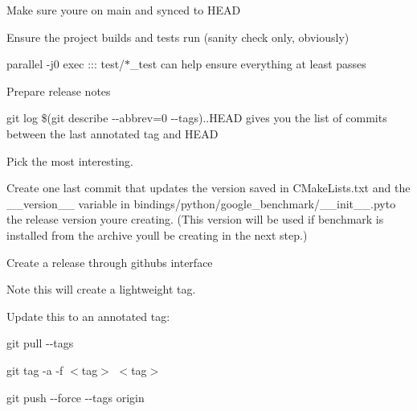 
\begin{DoxyItemize}
\item Make sure you\textquotesingle{}re on main and synced to H\+E\+AD
\item Ensure the project builds and tests run (sanity check only, obviously)
\begin{DoxyItemize}
\item {\ttfamily parallel -\/j0 exec \+::\+: test/$\ast$\+\_\+test} can help ensure everything at least passes
\end{DoxyItemize}
\item Prepare release notes
\begin{DoxyItemize}
\item {\ttfamily git log \$(git describe -\/-\/abbrev=0 -\/-\/tags)..H\+E\+AD} gives you the list of commits between the last annotated tag and H\+E\+AD
\item Pick the most interesting.
\end{DoxyItemize}
\item Create one last commit that updates the version saved in {\ttfamily C\+Make\+Lists.\+txt} and the {\ttfamily \+\_\+\+\_\+version\+\_\+\+\_\+} variable in {\ttfamily bindings/python/google\+\_\+benchmark/\+\_\+\+\_\+init\+\_\+\+\_\+.\+py}to the release version you\textquotesingle{}re creating. (This version will be used if benchmark is installed from the archive you\textquotesingle{}ll be creating in the next step.)
\end{DoxyItemize}


\begin{DoxyCode}{0}
\end{DoxyCode}



\begin{DoxyCode}{0}
\DoxyCodeLine{}
\DoxyCodeLine{}
\DoxyCodeLine{}
\end{DoxyCode}



\begin{DoxyItemize}
\item Create a release through github\textquotesingle{}s interface
\begin{DoxyItemize}
\item Note this will create a lightweight tag.
\item Update this to an annotated tag\+:
\begin{DoxyItemize}
\item {\ttfamily git pull -\/-\/tags}
\item {\ttfamily git tag -\/a -\/f $<$tag$>$ $<$tag$>$}
\item {\ttfamily git push -\/-\/force -\/-\/tags origin} 
\end{DoxyItemize}
\end{DoxyItemize}
\end{DoxyItemize}
